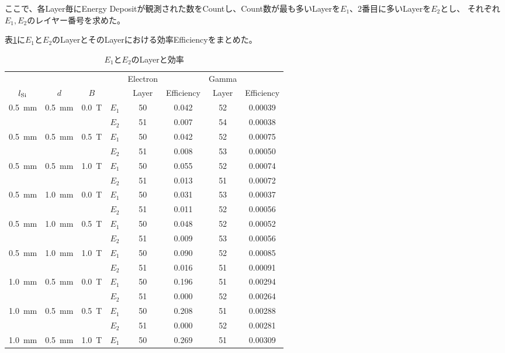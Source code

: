 \documentclass[a4paper,10pt]{jreport}
\begin{document}
ここで、各Layer毎にEnergy Depositが観測された数をCountし、Count数が最も多いLayerを$E_1$、2番目に多いLayerを$E_2$とし、
それぞれ$E_1,E_2$のレイヤー番号を求めた。

表\ref{Tab-LayerDetector-E1E2-Layer-Effciency}に$E_1$と$E_2$のLayerとそのLayerにおける効率Efficiencyをまとめた。

\begin{table}[H] 
	\center
	\caption{$E_1$と$E_2$のLayerと効率} \label{Tab-LayerDetector-E1E2-Layer-Effciency}
	\begin{tabular}{ccc|c|cc|cc}
		\hline
		 &  &  &  & Electron  &  & Gamma  &   \\
		$l_{\rm{Si}}$ & $d$ & $B$ &  & Layer & Efficiency &  Layer & Efficiency \\
		\hline \hline
		\SI{0.5}{mm} & \SI{0.5}{mm} & \SI{0.0}{T} & $E_1$ & 50 & 0.042 & 52 & 0.00039 \\
		&  &  & $E_2$ & 51 & 0.007 & 54 & 0.00038 \\
		\hline
		\SI{0.5}{mm} & \SI{0.5}{mm} & \SI{0.5}{T} & $E_1$ & 50 & 0.042 & 52 & 0.00075 \\
		  &  &  & $E_2$ & 51 & 0.008 & 53 & 0.00050 \\
		\hline
		\SI{0.5}{mm} & \SI{0.5}{mm} & \SI{1.0}{T} & $E_1$ & 50 & 0.055 & 52 & 0.00074 \\
		  &  &  & $E_2$ & 51 & 0.013 & 51 & 0.00072 \\
		\hline
		\SI{0.5}{mm} & \SI{1.0}{mm} & \SI{0.0}{T} & $E_1$ & 50 & 0.031 & 53 & 0.00037 \\
		  &  &  & $E_2$ & 51 & 0.011 & 52 & 0.00056 \\
		\hline
		\SI{0.5}{mm} & \SI{1.0}{mm} & \SI{0.5}{T} & $E_1$ & 50 & 0.048 & 52 & 0.00052 \\
		  &  &  & $E_2$ & 51 & 0.009 & 53 & 0.00056 \\
		\hline
		\SI{0.5}{mm} & \SI{1.0}{mm} & \SI{1.0}{T} & $E_1$ & 50 & 0.090 & 52 & 0.00085 \\
		  &  &  & $E_2$ & 51 & 0.016 & 51 & 0.00091 \\
		\hline
		\SI{1.0}{mm} & \SI{0.5}{mm} & \SI{0.0}{T} & $E_1$ & 50 & 0.196 & 51 & 0.00294 \\
		  &  &  & $E_2$ & 51 & 0.000 & 52 & 0.00264 \\
		\hline
		\SI{1.0}{mm} & \SI{0.5}{mm} & \SI{0.5}{T} & $E_1$ & 50 & 0.208 & 51 & 0.00288 \\
		  &  &  & $E_2$ & 51 & 0.000 & 52 & 0.00281 \\
		\hline
		\SI{1.0}{mm} & \SI{0.5}{mm} & \SI{1.0}{T} & $E_1$ & 50 & 0.269 & 51 & 0.00309 \\

\end{tabular}
\end{table}
\end{document}
